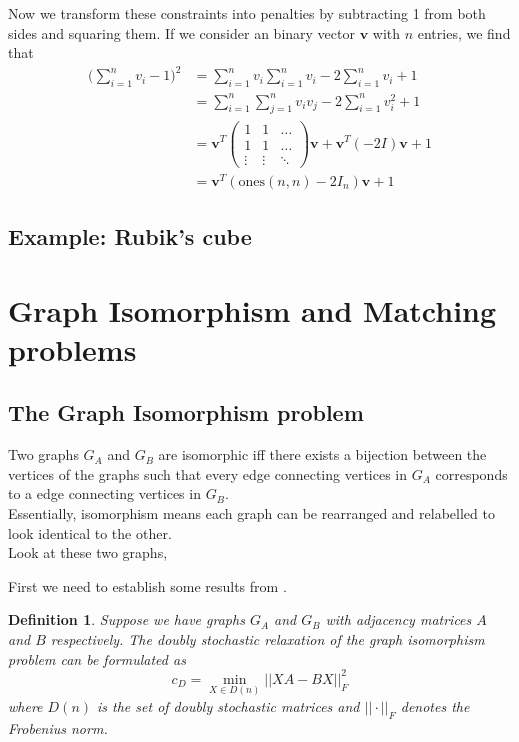 \documentclass{article}
\newtheorem{defn}[prop]{Definition}
\begin{document}
\noindent Now we transform these constraints into penalties by subtracting 1 from both sides and squaring them. If we consider an binary vector \(\mathbf{v}\) with \(n\) entries, we find that  
\begin{align*}
    \bigg(\sum_{i=1}^n v_i - 1\bigg)^2 &= \sum_{i=1}^n v_i \sum_{i=1}^n v_i - 2\sum_{i=1}^n v_i + 1 \\
    &= \sum_{i=1}^n \sum_{j=1}^n v_iv_j - 2\sum_{i=1}^n v_i^2 + 1 \\
    &= \mathbf{v}^T\begin{pmatrix}
        1 & 1 & \dots \\
        1 & 1 & \dots \\
        \vdots & \vdots & \ddots
    \end{pmatrix} \mathbf{v} + \mathbf{v}^T(-2 I)\mathbf{v} + 1 \\
    &= \mathbf{v}^T (\text{ones} (n, n) - 2I_n )\mathbf{v} + 1
\end{align*}





\subsection{Example: Rubik's cube}

\newpage

\section{Graph Isomorphism and Matching problems}
\subsection{The Graph Isomorphism problem}
Two graphs \(G_A\) and \(G_B\) are isomorphic iff there exists a bijection between the vertices of the graphs such that every edge connecting vertices in \(G_A\) corresponds to a edge connecting vertices in \(G_B\). \\
Essentially, isomorphism means each graph can be rearranged and relabelled to look identical to the other. \\

\noindent Look at these two graphs, 


\noindent First we need to establish some results from \autocite{klus2023continuous}.
\begin{defn}\label{def:1}
    \cite[p.~6]{klus2023continuous} Suppose we have graphs \(G_A\) and \(G_B\) with adjacency matrices \(A\) and \(B\) respectively. The doubly stochastic relaxation of the graph isomorphism problem can be formulated as
    \begin{equation*}
        c_D = \min_{X \in D(n)} ||XA - BX||^2_F
    \end{equation*}
    where \(D(n)\) is the set of doubly stochastic matrices and \(||\cdot||_F\) denotes the Frobenius norm.
\end{defn}
\end{document}
